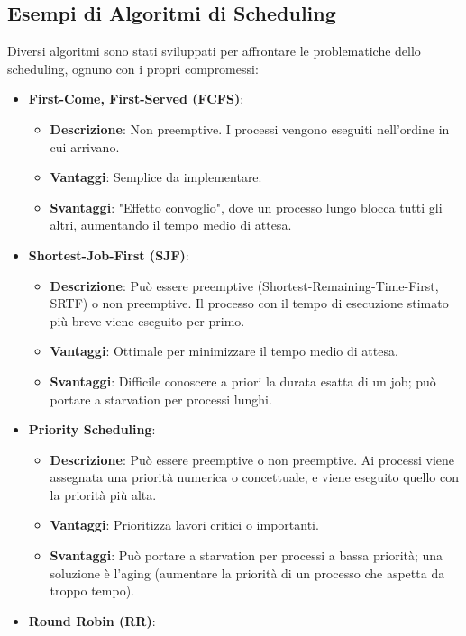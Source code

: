 \subsection{Esempi di Algoritmi di Scheduling}
Diversi algoritmi sono stati sviluppati per affrontare le problematiche dello scheduling, ognuno con i propri compromessi:
\begin{itemize}
    \item \textbf{First-Come, First-Served (FCFS)}:
    \begin{itemize}
        \item \textbf{Descrizione}: Non preemptive. I processi vengono eseguiti nell'ordine in cui arrivano.
        \item \textbf{Vantaggi}: Semplice da implementare.
        \item \textbf{Svantaggi}: "Effetto convoglio", dove un processo lungo blocca tutti gli altri, aumentando il tempo medio di attesa.
    \end{itemize}
    \item \textbf{Shortest-Job-First (SJF)}:
    \begin{itemize}
        \item \textbf{Descrizione}: Può essere preemptive (Shortest-Remaining-Time-First, SRTF) o non preemptive. Il processo con il tempo di esecuzione stimato più breve viene eseguito per primo.
        \item \textbf{Vantaggi}: Ottimale per minimizzare il tempo medio di attesa.
        \item \textbf{Svantaggi}: Difficile conoscere a priori la durata esatta di un job; può portare a starvation per processi lunghi.
    \end{itemize}
    \item \textbf{Priority Scheduling}:
    \begin{itemize}
        \item \textbf{Descrizione}: Può essere preemptive o non preemptive. Ai processi viene assegnata una priorità numerica o concettuale, e viene eseguito quello con la priorità più alta.
        \item \textbf{Vantaggi}: Prioritizza lavori critici o importanti.
        \item \textbf{Svantaggi}: Può portare a starvation per processi a bassa priorità; una soluzione è l'aging (aumentare la priorità di un processo che aspetta da troppo tempo).
    \end{itemize}
    \item \textbf{Round Robin (RR)}:

\end{itemize}
